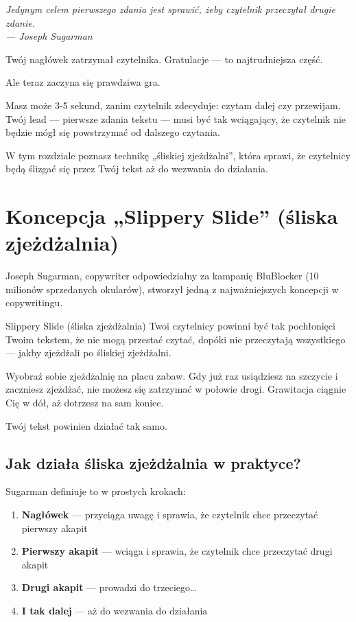 \documentclass[
  12pt,
  a4paper,
  twoside,
  openright,
  12pt,
  DIV=12,
  BCOR=12mm]{scrbook}
\providecommand{\tightlist}{%
  \setlength{\itemsep}{0pt}\setlength{\parskip}{0pt}}\usepackage{longtable,booktabs,array}
\newcommand{\chapteropener}[1]{%
  \begin{center}
    \large\itshape\color{textmuted}#1
  \end{center}
  \vspace{1em}
}
\begin{document}
\hfill\break

\chapteropener{Jedynym celem pierwszego zdania jest sprawić, żeby czytelnik przeczytał drugie zdanie.\\--- Joseph Sugarman}

Twój nagłówek zatrzymał czytelnika. Gratulacje --- to najtrudniejsza
część.

Ale teraz zaczyna się prawdziwa gra.

Masz może 3-5 sekund, zanim czytelnik zdecyduje: czytam dalej czy
przewijam. Twój lead --- pierwsze zdania tekstu --- musi być tak
wciągający, że czytelnik nie będzie mógł się powstrzymać od dalszego
czytania.

W tym rozdziale poznasz technikę „śliskiej zjeżdżalni'', która sprawi,
że czytelnicy będą ślizgać się przez Twój tekst aż do wezwania do
działania.

\section{Koncepcja „Slippery Slide'' (śliska
zjeżdżalnia)}\label{koncepcja-slippery-slide-ux15bliska-zjeux17cdux17calnia}

Joseph Sugarman, copywriter odpowiedzialny za kampanię BluBlocker (10
milionów sprzedanych okularów), stworzył jedną z najważniejszych
koncepcji w copywritingu.

\begin{pojecie}{Slippery Slide (śliska zjeżdżalnia)}
Twoi czytelnicy powinni być tak pochłonięci Twoim tekstem, że nie mogą przestać czytać, dopóki nie przeczytają wszystkiego --- jakby zjeżdżali po śliskiej zjeżdżalni.
\end{pojecie}

Wyobraź sobie zjeżdżalnię na placu zabaw. Gdy już raz usiądziesz na
szczycie i zaczniesz zjeżdżać, nie możesz się zatrzymać w połowie drogi.
Grawitacja ciągnie Cię w dół, aż dotrzesz na sam koniec.

Twój tekst powinien działać tak samo.

\subsection{Jak działa śliska zjeżdżalnia w
praktyce?}\label{jak-dziaux142a-ux15bliska-zjeux17cdux17calnia-w-praktyce}

Sugarman definiuje to w prostych krokach:

\begin{enumerate}
\def\labelenumi{\arabic{enumi}.}
\tightlist
\item
  \textbf{Nagłówek} --- przyciąga uwagę i sprawia, że czytelnik chce
  przeczytać pierwszy akapit
\item
  \textbf{Pierwszy akapit} --- wciąga i sprawia, że czytelnik chce
  przeczytać drugi akapit
\item
  \textbf{Drugi akapit} --- prowadzi do trzeciego\ldots{}
\item
  \textbf{I tak dalej} --- aż do wezwania do działania
\end{enumerate}
\end{document}
